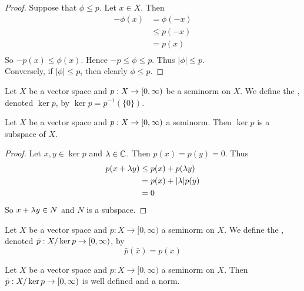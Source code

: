 \documentclass{book}
\begin{document}
	\begin{proof}
		Suppose that $\phi \leq p$. Let $x \in X$. Then 
		\begin{align*}
			-\phi(x)
			& = \phi(-x) \\
			& \leq p(-x) \\
			& = p(x) \\
		\end{align*}
		So $-p(x) \leq \phi(x)$. Hence $-p \leq \phi \leq p$. Thus $|\phi| \leq p$. \\
		Conversely, if $|\phi| \leq p$, then clearly $\phi \leq p$.
	\end{proof}
	
	\begin{defn}
		Let $X$ be a vector space and $p:X \rightarrow [0,\infty)$ be a seminorm on $X$. We define the , denoted $\ker p$, by $\ker p = p^{-1}(\{0\})$.
	\end{defn}
	
	\begin{ex}
		Let $X$ be a vector space and $p: X \rightarrow [0,\infty)$ a seminorm. Then $\ker p$ is a subspace of $X$.
	\end{ex}
	
	\begin{proof}
		Let $x, y \in \ker p$ and $\lambda \in \mathbb{C}$. Then $p(x) = p(y) = 0$. Thus 
		\begin{align*}
			p(x + \lambda y) 
			&\leq p(x) + p(\lambda y) \\
			&= p(x) + |\lambda|p(y) \\
			&= 0
		\end{align*} 
		So $x + \lambda y \in N$ and $N$ is a subspace.
	\end{proof}
	
	
	\begin{defn}
		Let $X$ be a vector space and $p:X \rightarrow [0, \infty)$ a seminorm on $X$. We define the , denoted $\bar{p} : X / \ker p \rightarrow  [0,\infty)$, by $$\bar{p}(\bar{x}) = p(x)$$
	\end{defn}
	
	\begin{ex}
		Let $X$ be a vector space and $p:X \rightarrow [0, \infty)$ a seminorm on $X$. Then $\bar{p} : X / \ker p \rightarrow  [0,\infty)$ is well defined and a norm. 
	\end{ex}
	
\end{document}
